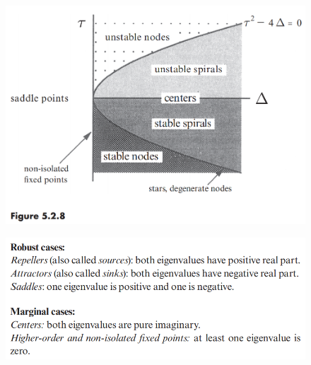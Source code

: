 \documentclass[10pt,aspectratio=43,mathserif,table]{beamer}
\begin{document}
\begin{frame}
    \begin{figure}
        \centering
        \includegraphics[width=0.55\linewidth]{f528.jpg}
    \end{figure}
    \begin{figure}
        \centering
        \includegraphics[width=0.7\linewidth]{classify.jpg}
    \end{figure}
\end{frame}

\end{document}
